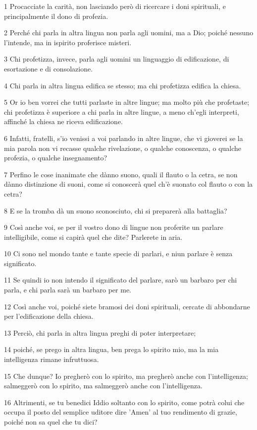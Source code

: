 \par 1 Procacciate la carità, non lasciando però di ricercare i doni spirituali, e principalmente il dono di profezia.
\par 2 Perché chi parla in altra lingua non parla agli uomini, ma a Dio; poiché nessuno l'intende, ma in ispirito proferisce misteri.
\par 3 Chi profetizza, invece, parla agli uomini un linguaggio di edificazione, di esortazione e di consolazione.
\par 4 Chi parla in altra lingua edifica se stesso; ma chi profetizza edifica la chiesa.
\par 5 Or io ben vorrei che tutti parlaste in altre lingue; ma molto più che profetaste; chi profetizza è superiore a chi parla in altre lingue, a meno ch'egli interpreti, affinché la chiesa ne riceva edificazione.
\par 6 Infatti, fratelli, s'io venissi a voi parlando in altre lingue, che vi gioverei se la mia parola non vi recasse qualche rivelazione, o qualche conoscenza, o qualche profezia, o qualche insegnamento?
\par 7 Perfino le cose inanimate che dànno suono, quali il flauto o la cetra, se non dànno distinzione di suoni, come si conoscerà quel ch'è suonato col flauto o con la cetra?
\par 8 E se la tromba dà un suono sconosciuto, chi si preparerà alla battaglia?
\par 9 Così anche voi, se per il vostro dono di lingue non proferite un parlare intelligibile, come si capirà quel che dite? Parlerete in aria.
\par 10 Ci sono nel mondo tante e tante specie di parlari, e niun parlare è senza significato.
\par 11 Se quindi io non intendo il significato del parlare, sarò un barbaro per chi parla, e chi parla sarà un barbaro per me.
\par 12 Così anche voi, poiché siete bramosi dei doni spirituali, cercate di abbondarne per l'edificazione della chiesa.
\par 13 Perciò, chi parla in altra lingua preghi di poter interpretare;
\par 14 poiché, se prego in altra lingua, ben prega lo spirito mio, ma la mia intelligenza rimane infruttuosa.
\par 15 Che dunque? Io pregherò con lo spirito, ma pregherò anche con l'intelligenza; salmeggerò con lo spirito, ma salmeggerò anche con l'intelligenza.
\par 16 Altrimenti, se tu benedici Iddio soltanto con lo spirito, come potrà colui che occupa il posto del semplice uditore dire 'Amen' al tuo rendimento di grazie, poiché non sa quel che tu dici?
